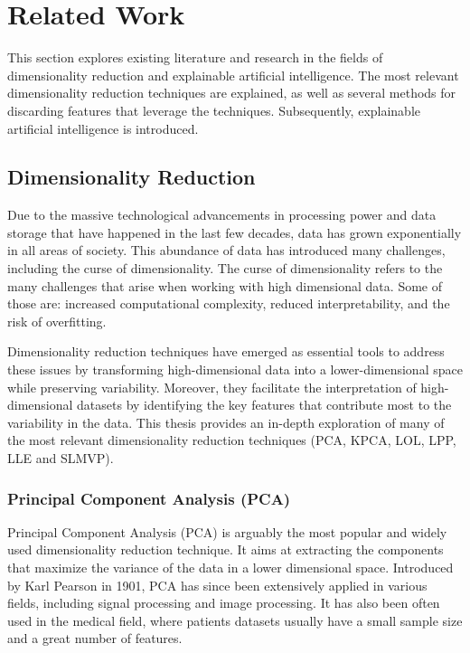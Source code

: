 \chapter{Related Work}
This section explores existing literature and research in the fields of dimensionality reduction and explainable artificial intelligence. The most relevant dimensionality reduction techniques are explained, as well as several methods for discarding features that leverage the techniques. Subsequently, explainable artificial intelligence is introduced.

\section{Dimensionality Reduction}
Due to the massive technological advancements in processing power and data storage that have happened in the last few decades, data has grown exponentially in all areas of society. This abundance of data has introduced many challenges, including the curse of dimensionality. The curse of dimensionality refers to the many challenges that arise when working with high dimensional data. \cite{curse_dim} Some of those are: increased computational complexity, reduced interpretability, and the risk of overfitting.

Dimensionality reduction techniques have emerged as essential tools to address these issues by transforming high-dimensional data into a lower-dimensional space while preserving variability. Moreover, they facilitate the interpretation of high-dimensional datasets by identifying the key features that contribute most to the variability in the data.
This thesis provides an in-depth exploration of many of the most relevant dimensionality reduction techniques (PCA, KPCA, LOL, LPP, LLE and SLMVP).

\subsection{Principal Component Analysis (PCA)}
Principal Component Analysis (PCA) \cite{pca} is arguably the most popular and widely used dimensionality reduction technique. It aims at extracting the components that maximize the variance of the data in a lower dimensional space. Introduced by Karl Pearson in 1901, PCA has since been extensively applied in various fields, including signal processing and image processing. It has also been often used in the medical field, where patients datasets usually have a small sample size and a great number of features.

